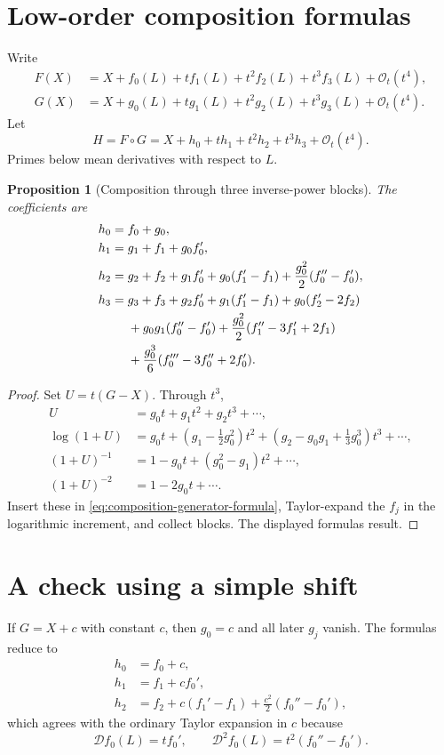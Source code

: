 \documentclass[11pt,oneside]{book}
\newtheorem{proposition}[theorem]{Proposition}
\theoremstyle{definition}
\theoremstyle{remark}
\newcommand{\D}{\mathcal D}
\newcommand{\bigO}{\mathcal O}
\newcommand{\compose}{\mathbin{\circ}}
\begin{document}
\section{Low-order composition formulas}
Write
\begin{align}\label{eq:F-G-coeff-notation}
 F(X)&=X+f_0(L)+t f_1(L)+t^2f_2(L)+t^3f_3(L)+\bigO_t(t^4),\\
 G(X)&=X+g_0(L)+t g_1(L)+t^2g_2(L)+t^3g_3(L)+\bigO_t(t^4).
\end{align}
Let
\[
 H=F\compose G
 =X+h_0+t h_1+t^2h_2+t^3h_3+\bigO_t(t^4).
\]
Primes below mean derivatives with respect to $L$.

\begin{proposition}[Composition through three inverse-power blocks]
\label{prop:composition-first-blocks}
The coefficients are
\begin{align}
 h_0={}&f_0+g_0,\label{eq:h0}\\
 h_1={}&g_1+f_1+g_0f_0',\label{eq:h1}\\
 h_2={}&g_2+f_2+g_1f_0'
 +g_0(f_1'-f_1)
 +\frac{g_0^2}{2}(f_0''-f_0'),\label{eq:h2}\\
 h_3={}&g_3+f_3+g_2f_0'
 +g_1(f_1'-f_1)+g_0(f_2'-2f_2)\notag\\
 &+g_0g_1(f_0''-f_0')
 +\frac{g_0^2}{2}(f_1''-3f_1'+2f_1)\notag\\
 &+\frac{g_0^3}{6}(f_0'''-3f_0''+2f_0').
 \label{eq:h3}
\end{align}
\end{proposition}
\begin{proof}
Set $U=t(G-X)$.  Through $t^3$,
\begin{align*}
 U&=g_0t+g_1t^2+g_2t^3+\cdots,\\
 \log(1+U)
 &=g_0t+\left(g_1-\frac12g_0^2\right)t^2
 +\left(g_2-g_0g_1+\frac13g_0^3\right)t^3+\cdots,\\
 (1+U)^{-1}
 &=1-g_0t+(g_0^2-g_1)t^2+\cdots,\\
 (1+U)^{-2}
 &=1-2g_0t+\cdots.
\end{align*}
Insert these in \eqref{eq:composition-generator-formula}, Taylor-expand the
$f_j$ in the logarithmic increment, and collect blocks.  The displayed
formulas result.
\end{proof}

\section{A check using a simple shift}
If $G=X+c$ with constant $c$, then $g_0=c$ and all later $g_j$ vanish.  The
formulas reduce to
\begin{align*}
 h_0&=f_0+c,\\
 h_1&=f_1+cf_0',\\
 h_2&=f_2+c(f_1'-f_1)+\frac{c^2}{2}(f_0''-f_0'),
\end{align*}
which agrees with the ordinary Taylor expansion in $c$ because
\[
 \D f_0(L)=tf_0',
 \qquad
 \D^2 f_0(L)=t^2(f_0''-f_0').
\]
\end{document}
